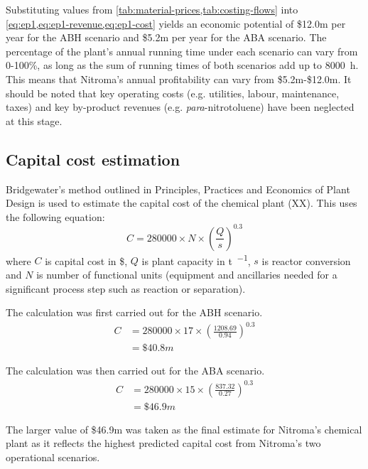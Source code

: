 Substituting values from \cref{tab:material-prices,tab:costing-flows} into \cref{eq:ep1,eq:ep1-revenue,eq:ep1-cost} yields an economic potential of \$12.0m per year for the ABH scenario and \$5.2m per year for the ABA scenario. The percentage of the plant's annual running time under each scenario can vary from 0-100\%, as long as the sum of running times of both scenarios add up to \SI{8000}{\hour}. This means that Nitroma's annual profitability can vary from \$5.2m-\$12.0m. It should be noted that key operating costs (e.g. utilities, labour, maintenance, taxes) and key by-product revenues (e.g. \textit{para}-nitrotoluene) have been neglected at this stage.

\subsection{Capital cost estimation}
Bridgewater's method outlined in Principles, Practices and Economics of Plant Design is used to estimate the capital cost of the chemical plant (XX). This uses the following equation:
\begin{equation}
    C= \num{280000} \times N \times \left(\frac{Q}{s}\right)^{0.3}
\end{equation}
where $C$ is capital cost in \$, $Q$ is  plant capacity in \si{\tonne\per\year}, $s$ is reactor conversion and $N$ is number of functional units (equipment and ancillaries needed for a significant process step such as reaction or separation).

The calculation was first carried out for the ABH scenario.
\begin{align*}
C &= 280000 \times 17 \times \left(\frac{1208.69}{0.94}\right)^{0.3}  \\
  &=\$40.8m 
\end{align*}

The calculation was then carried out for the ABA scenario.
\begin{align*}
C &= \num{280000} \times 15 \times \left(\frac{837.32}{0.27}\right)^{0.3}  \\
  &= \$46.9m 
\end{align*}

The larger value of \$46.9m was taken as the final estimate for Nitroma's chemical plant as it reflects the highest predicted capital cost from Nitroma's two operational scenarios.